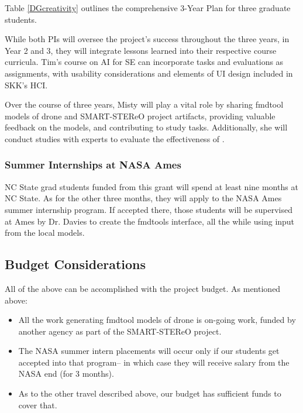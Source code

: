 \documentclass[twoside]{NSF}
\newenvironment{myitemize}
{ \begin{itemize}[topsep=0pt,itemsep=0pt,leftmargin=*]
    \setlength{\itemsep}{0pt}
    \setlength{\parskip}{0pt}
    \setlength{\parsep}{0pt}     }
{ \end{itemize}                  }
\newcommand{\bi}{\begin{myitemize}}
\newcommand{\ei}{\end{myitemize}}
\newcommand{\IT}{{\sffamily {\em \mbox{ADVICE}}}}
\begin{document}
Table \ref{DGcreativity} outlines the comprehensive 3-Year Plan for three graduate students.

While both PIs will oversee the project's success throughout the three years, in Year 2 and 3, they will integrate lessons learned into their respective course curricula. Tim's course on AI for SE can incorporate tasks and evaluations as assignments, with usability considerations and elements of UI design included in SKK's HCI.

Over the course of three years, Misty will play a vital role by sharing fmdtool models of drone and SMART-STEReO project artifacts, providing valuable feedback on the models, and contributing to study tasks. Additionally, she will conduct studies with experts to evaluate the effectiveness of \IT.

\subsubsection*{Summer Internships at NASA Ames}
 NC State grad students funded from this grant will spend at least nine months at NC State. As for the other three months, they will  apply to the NASA
Ames summer internship program. If accepted there, those
students will be supervised at Ames by Dr. Davies
to create the fmdtools interface, all the while using input
from the local models.


\subsection*{Budget Considerations}

All of the above can be accomplished with the project budget. As mentioned above:

\bi 
\item All the work generating fmdtool models of drone   is  on-going work, funded by another agency as part of the SMART-STEReO project.
\item 
The NASA summer intern placements will occur only if our students get accepted into that program-- in which case they will receive salary from the NASA end (for 3 months). 

\item As to the other travel described above, our budget has sufficient funds to cover that.
\ei
\end{document}
